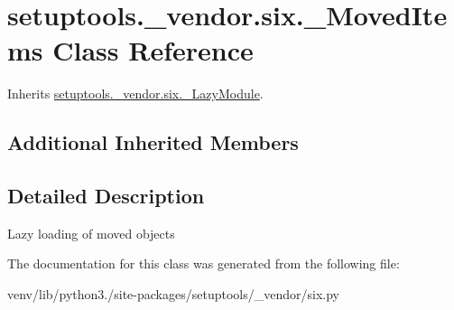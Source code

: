 \hypertarget{classsetuptools_1_1__vendor_1_1six_1_1___moved_items}{}\section{setuptools.\+\_\+vendor.\+six.\+\_\+\+Moved\+Items Class Reference}
\label{classsetuptools_1_1__vendor_1_1six_1_1___moved_items}


Inherits \hyperlink{classsetuptools_1_1__vendor_1_1six_1_1___lazy_module}{setuptools.\+\_\+vendor.\+six.\+\_\+\+Lazy\+Module}.

\subsection*{Additional Inherited Members}


\subsection{Detailed Description}
\begin{DoxyVerb}Lazy loading of moved objects\end{DoxyVerb}
 

The documentation for this class was generated from the following file\+:\begin{DoxyCompactItemize}
\item 
venv/lib/python3./site-\/packages/setuptools/\+\_\+vendor/six.\+py\end{DoxyCompactItemize}
